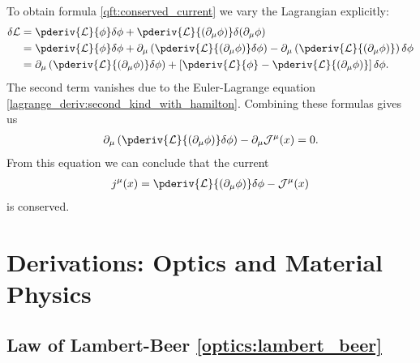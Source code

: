     To obtain formula \ref{qft:conserved_current} we vary the Lagrangian explicitly:
    \begin{align*}
        \delta\mathcal{L} &= \pderiv{\mathcal{L}}{\phi}\delta\phi + \pderiv{\mathcal{L}}{(\partial_\mu\phi)}\delta(\partial_\mu\phi)\\
        &= \pderiv{\mathcal{L}}{\phi}\delta\phi + \partial_\mu\left(\pderiv{\mathcal{L}}{(\partial_\mu\phi)}\delta\phi\right) - \partial_\mu\left(\pderiv{\mathcal{L}}{(\partial_\mu\phi)}\right)\delta\phi\\
        &= \partial_\mu\left(\pderiv{\mathcal{L}}{(\partial_\mu\phi)}\delta\phi\right) + \left[\pderiv{\mathcal{L}}{\phi} - \pderiv{\mathcal{L}}{(\partial_\mu\phi)}\right]\delta\phi.
    \end{align*}
    The second term vanishes due to the Euler-Lagrange equation \ref{lagrange_deriv:second_kind_with_hamilton}. Combining these formulas gives us
    \begin{gather}
        \partial_\mu\left(\pderiv{\mathcal{L}}{(\partial_\mu\phi)}\delta\phi\right) - \partial_\mu\mathcal{J}^\mu(x) = 0.
    \end{gather}
    From this equation we can conclude that the current
    \begin{gather}
        j^\mu(x) = \pderiv{\mathcal{L}}{(\partial_\mu\phi)}\delta\phi - \mathcal{J}^\mu(x)
    \end{gather}
    is conserved.


\chapter{Derivations: Optics and Material Physics}

\section{Law of Lambert-Beer \ref{optics:lambert_beer}}

